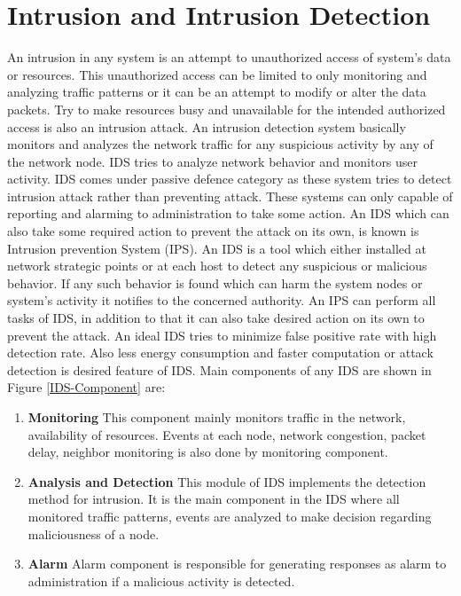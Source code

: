 \section{Intrusion and Intrusion Detection}
An intrusion in any system is an attempt to unauthorized access of system's data or resources. This unauthorized access can be limited to only monitoring and analyzing traffic patterns or it can be an attempt to modify or alter the data packets. Try to make resources busy and unavailable for the intended authorized access is also an intrusion attack. An intrusion detection system basically monitors and analyzes the network traffic for any suspicious activity by any of the network node. IDS tries to analyze network behavior and monitors user activity. IDS comes under passive defence category as these system tries to detect intrusion attack rather than preventing attack. These systems can only capable of reporting and alarming to administration to take some action. An IDS which can also take some required action to prevent the attack on its own, is known is Intrusion prevention System (IPS). An IDS is a tool which either installed at network strategic points or at each host to detect any suspicious or malicious behavior. If any such behavior is found which can harm the system nodes or system's activity it notifies to the concerned authority. An IPS can perform all tasks of IDS, in addition to that it can also take desired action on its own to prevent the attack. An ideal IDS tries to minimize false positive rate with high detection rate. Also less energy consumption and faster computation or attack detection is desired feature of IDS. Main components of any IDS are shown in Figure \ref{IDS-Component} \cite{alrajeh2013intrusion} are:
\begin{enumerate}[label=\textbf{\roman*.}]
\item \textbf{Monitoring} This component mainly monitors traffic in the network, availability of resources. Events at each node, network congestion, packet delay, neighbor monitoring is also done by monitoring component.
\item \textbf{Analysis and Detection} This module of IDS implements the detection method for intrusion. It is the main component in the IDS where all monitored traffic patterns, events are analyzed to make decision regarding maliciousness of a node.
\item \textbf{Alarm} Alarm component is responsible for generating responses as alarm to administration if a malicious activity is detected.
\end{enumerate}
